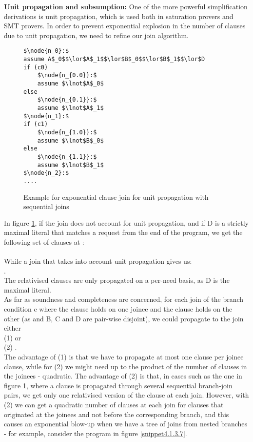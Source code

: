 \textbf{Unit propagation and subsumption:}
One of the more powerful simplification derivations is unit propagation, which is used both in saturation provers and SMT provers.
In order to prevent exponential explosion in the number of clauses due to unit propagation, we need to refine our join algorithm.

\begin{figure}
\begin{lstlisting}
$\node{n_0}:$
assume A$_0$$\lor$A$_1$$\lor$B$_0$$\lor$B$_1$$\lor$D
if (c0)
	$\node{n_{0.0}}:$	
	assume $\lnot$A$_0$
else	
	$\node{n_{0.1}}:$
	assume $\lnot$A$_1$
$\node{n_1}:$
if (c1)
	$\node{n_{1.0}}:$	
	assume $\lnot$B$_0$
else	
	$\node{n_{1.1}}:$
	assume $\lnot$B$_1$
$\node{n_2}:$
....
\end{lstlisting}
\caption{Example for exponential clause join for unit propagation with sequential joins\\
 }
\label{snippet4.1.3.6}
\end{figure}


In figure \ref{snippet4.1.3.6}, if the join does not account for unit propagation, and if D is a strictly maximal literal that matches a request from the end of the program, we get the following set of clauses at :\\
\\
While a join that takes into account unit propagation gives us:\\
.\\
The relativised clauses  are only propagated on a per-need basis, as D is the maximal literal.\\
As far as soundness and completeness are concerned, for each join of the branch condition c where the clause  holds on one joinee and the clause  holds on the other (as  and B, C and D are pair-wise disjoint), we could propagate to the join either\\
(1)  or\\
(2) .\\
The advantage of (1) is that we have to propagate at most one clause per joinee clause, while for (2) we might need up to the product of the number of clauses in the joinees - quadratic.
The advantage of (2) is that, in cases such as the one in figure \ref{snippet4.1.3.6}, 
where a clause is propagated through several sequential branch-join pairs, we get only one relativised version of the clause at each join. However, with (2) we can get a quadratic number of clauses at each join for clauses that originated at the joinees and not before the corresponding branch, and this causes an exponential blow-up when we have a tree of joins from nested branches - for example, consider the program in figure \ref{snippet4.1.3.7}.

